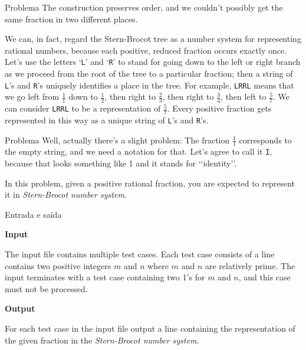 \begin{frame}[fragile]{Problema}
The construction preserves order, and we couldn’t possibly get the same fraction in two 
different places.

We can, in fact, regard the Stern-Brocot tree as a number system for representing rational numbers,
because each positive, reduced fraction occurs exactly once. Let’s use the letters ‘\texttt{L}’ 
and ‘\texttt{R}’ to stand for going down to the left or right branch as we proceed from the root 
of the tree to a particular fraction; then a string of \texttt{L}’s and \texttt{R}’s uniquely 
identifies a place in the tree. For example, \texttt{LRRL} means that we go left from $\frac{1}{1}$
down to $\frac{1}{2}$, then right to $\frac{2}{3}$, then right to $\frac{3}{4}$, then left to 
$\frac{5}{7}$. We can consider \texttt{LRRL} to be a representation of $\frac{5}{7}$. Every 
positive fraction gets represented in this way as a unique string of \texttt{L}’s and 
\texttt{R}’s.

\end{frame}

\begin{frame}[fragile]{Problema}
Well, actually there’s a slight problem: The fraction $\frac{1}{1}$ corresponds to the empty 
string, and we need a notation for that. Let’s agree to call it \texttt{I}, because that looks 
something like 1 and it stands for \lq\lq identity\rq\rq.

In this problem, given a positive rational fraction, you are expected to represent it in 
\textit{Stern-Brocot number system}.
\end{frame}

\begin{frame}[fragile]{Entrada e saída}

\textbf{Input}

The input file contains multiple test cases. Each test case consists of a line contains two 
positive integers $m$ and $n$ where $m$ and $n$ are relatively prime. The input terminates with a 
test case containing two 1’s for $m$ and $n$, and this case must not be processed.

\vspace{0.1in}

\textbf{Output}

For each test case in the input file output a line containing the representation of the given 
fraction in the \textit{Stern-Brocot number system}.

\end{frame}

